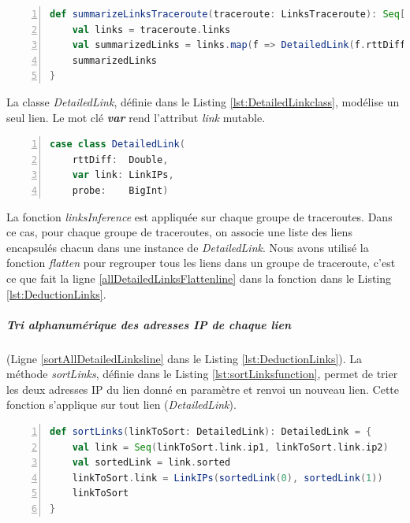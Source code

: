 \begin{lstlisting}[language=scala,firstnumber=1, caption={Définition de la fonction summarizeLinksTraceroute},label={lst:summarizeLinksTraceroutefunction}, basicstyle = \footnotesize,escapechar=|,numbers=left,
stepnumber=1] 
  def summarizeLinksTraceroute(traceroute: LinksTraceroute): Seq[DetailedLink] = {
	val links = traceroute.links
	val summarizedLinks = links.map(f => DetailedLink(f.rttDiff, LinkIPs(f.ip1, f.ip2), traceroute.prb_id))
	summarizedLinks
}
\end{lstlisting}

La classe \textit{DetailedLink}, définie dans le Listing \ref{lst:DetailedLinkclass},   modélise un seul lien.  Le mot clé \textbf{\textit{var}} rend l'attribut \textit{link} mutable.
\begin{lstlisting}[language=scala,firstnumber=1, caption={Définition de la classe DetailedLink},label={lst:DetailedLinkclass}, basicstyle = \footnotesize,escapechar=|,numbers=left,
stepnumber=1] 
case class DetailedLink(
	rttDiff:  Double,
	var link: LinkIPs,
	probe:    BigInt)
\end{lstlisting}

La fonction \textit{linksInference} est appliquée sur chaque groupe de traceroutes. Dans ce cas, pour chaque groupe de traceroutes, on associe une liste des liens encapsulés chacun dans une instance de \textit{DetailedLink}. Nous avons utilisé la fonction \textit{flatten} pour regrouper tous les liens dans un groupe de traceroute, c'est ce que fait la ligne \ref{allDetailedLinksFlattenline} dans la fonction dans le Listing \ref{lst:DeductionLinks}.

\subparagraph{Tri alphanumérique des adresses IP de chaque lien} (Ligne \ref{sortAllDetailedLinksline} dans le Listing \ref{lst:DeductionLinks}). La méthode \textit{sortLinks}, définie dans le Listing \ref{lst:sortLinksfunction}, permet de trier les deux adresses IP du lien donné en paramètre et renvoi un nouveau lien. Cette fonction s'applique sur tout lien (\textit{DetailedLink}).
\begin{lstlisting}[language=scala,firstnumber=1, caption={Définition de la fonction sortLinks},label={lst:sortLinksfunction}, basicstyle = \footnotesize,escapechar=|,numbers=left,
stepnumber=1] 
def sortLinks(linkToSort: DetailedLink): DetailedLink = {
	val link = Seq(linkToSort.link.ip1, linkToSort.link.ip2)
	val sortedLink = link.sorted
	linkToSort.link = LinkIPs(sortedLink(0), sortedLink(1))
	linkToSort
}
\end{lstlisting}


